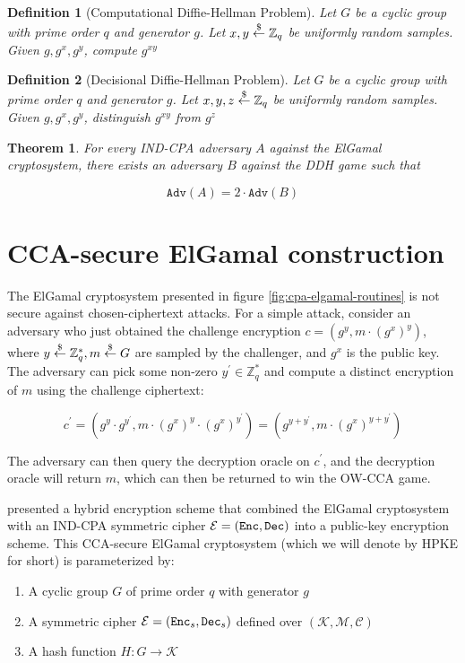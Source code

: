\documentclass{article}
\newtheorem{definition}{Definition}[section]
\newtheorem{theorem}{Theorem}[section]
\begin{document}
\begin{definition}[Computational Diffie-Hellman Problem]
    Let $G$ be a cyclic group with prime order $q$ and generator $g$. Let $x, y \stackrel{\$}{\leftarrow} \mathbb{Z}_q$ be uniformly random samples. Given $g, g^x,g^y$, compute $g^{xy}$
\end{definition}

\begin{definition}[Decisional Diffie-Hellman Problem]
    Let $G$ be a cyclic group with prime order $q$ and generator $g$. Let $x, y, z \stackrel{\$}{\leftarrow} \mathbb{Z}_q$ be uniformly random samples. Given $g, g^x, g^y$, distinguish $g^{xy}$ from $g^z$
\end{definition}

\begin{theorem}
    For every IND-CPA adversary $A$ against the ElGamal cryptosystem, there exists an adversary $B$ against the DDH game such that

    \begin{equation*}
        \texttt{Adv}(A) = 2 \cdot \texttt{Adv}(B)
    \end{equation*}
\end{theorem}


\section{CCA-secure ElGamal construction}
The ElGamal cryptosystem presented in figure \ref{fig:cpa-elgamal-routines} is not secure against chosen-ciphertext attacks. For a simple attack, consider an adversary who just obtained the challenge encryption $c = (g^y, m \cdot (g^x)^y)$, where $y \stackrel{\$}{\leftarrow} \mathbb{Z}_q^\ast, m \stackrel{\$}{\leftarrow} G$ are sampled by the challenger, and $g^x$ is the public key. The adversary can pick some non-zero $y^\prime \in \mathbb{Z}_q^\ast$ and compute a distinct encryption of $m$ using the challenge ciphertext:

\begin{equation*}
    c^\prime = (g^y \cdot g^{y^\prime}, m \cdot (g^x)^y \cdot (g^x)^{y^\prime})
    = (g^{y + y^\prime}, m \cdot (g^x)^{y + y^\prime})
\end{equation*}

The adversary can then query the decryption oracle on $c^\prime$, and the decryption oracle will return $m$, which can then be returned to win the OW-CCA game.

\cite{boneh2020graduate} presented a hybrid encryption scheme that combined the ElGamal cryptosystem with an IND-CPA symmetric cipher $\mathcal{E} = (\texttt{Enc}, \texttt{Dec})$ into a public-key encryption scheme. This CCA-secure ElGamal cryptosystem (which we will denote by HPKE for short) is parameterized by: \begin{enumerate}
    \item A cyclic group $G$ of prime order $q$ with generator $g$
    \item A symmetric cipher $\mathcal{E} = (\texttt{Enc}_s, \texttt{Dec}_s)$ defined over $(\mathcal{K}, \mathcal{M}, \mathcal{C})$
    \item A hash function $H: G \rightarrow \mathcal{K}$
\end{enumerate}
\end{document}
